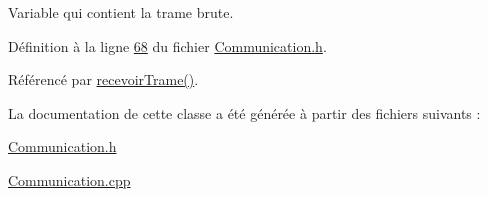 Variable qui contient la trame brute. 



Définition à la ligne \hyperlink{_communication_8h_source_l00068}{68} du fichier \hyperlink{_communication_8h_source}{Communication.\+h}.



Référencé par \hyperlink{_communication_8cpp_source_l00119}{recevoir\+Trame()}.



La documentation de cette classe a été générée à partir des fichiers suivants \+:\begin{DoxyCompactItemize}
\item 
\hyperlink{_communication_8h}{Communication.\+h}\item 
\hyperlink{_communication_8cpp}{Communication.\+cpp}\end{DoxyCompactItemize}
